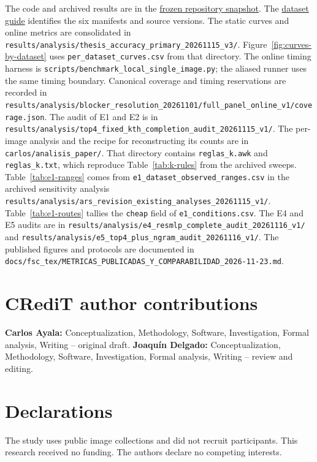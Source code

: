 \documentclass[10pt,a4paper,fleqn]{article}
\begin{document}
The code and archived results are in the \href{https://github.com/Joafp/concatenacion-descriptores-texturas/tree/97e4a8a4fe3b551f529a6e1f8814f6125cccaf78}{frozen repository snapshot}. The \href{https://github.com/Joafp/concatenacion-descriptores-texturas/blob/main/carlos/revision_paper/DATA_AVAILABILITY.md}{dataset guide} identifies the six manifests and source versions. The static curves and online metrics are consolidated in \nolinkurl{results/analysis/thesis_accuracy_primary_20261115_v3/}. Figure~\ref{fig:curves-by-dataset} uses \nolinkurl{per_dataset_curves.csv} from that directory. The online timing harness is \nolinkurl{scripts/benchmark_local_single_image.py}; the aliased runner uses the same timing boundary. Canonical coverage and timing reservations are recorded in \nolinkurl{results/analysis/blocker_resolution_20261101/full_panel_online_v1/coverage.json}. The audit of E1 and E2 is in \nolinkurl{results/analysis/top4_fixed_kth_completion_audit_20261115_v1/}. The per-image analysis and the recipe for reconstructing its counts are in \nolinkurl{carlos/analisis_paper/}. That directory contains \nolinkurl{reglas_k.awk} and \nolinkurl{reglas_k.txt}, which reproduce Table~\ref{tab:k-rules} from the archived sweeps. Table~\ref{tab:e1-ranges} comes from \nolinkurl{e1_dataset_observed_ranges.csv} in the archived sensitivity analysis \nolinkurl{results/analysis/ars_revision_existing_analyses_20261115_v1/}. Table~\ref{tab:e1-routes} tallies the \texttt{cheap} field of \nolinkurl{e1_conditions.csv}. The E4 and E5 audits are in \nolinkurl{results/analysis/e4_resmlp_complete_audit_20261116_v1/} and \nolinkurl{results/analysis/e5_top4_plus_ngram_audit_20261116_v1/}. The published figures and protocols are documented in \nolinkurl{docs/fsc_tex/METRICAS_PUBLICADAS_Y_COMPARABILIDAD_2026-11-23.md}.

\section*{CRediT author contributions}
\textbf{Carlos Ayala:} Conceptualization, Methodology, Software, Investigation, Formal analysis, Writing -- original draft.
\textbf{Joaquín Delgado:} Conceptualization, Methodology, Software, Investigation, Formal analysis, Writing -- review and editing.

\section*{Declarations}

The study uses public image collections and did not recruit participants. This research received no funding. The authors declare no competing interests.



\end{document}
